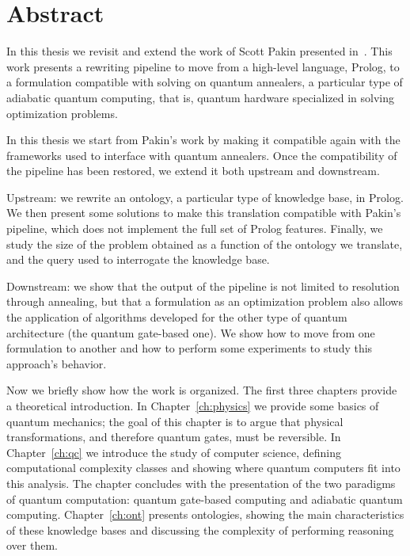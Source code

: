 
\chapter{Abstract}
In this thesis we revisit and extend the work of Scott Pakin presented in~\cite{pakin2018performing}. This work presents a rewriting pipeline to move from a high-level language, Prolog, to a formulation compatible with solving on quantum annealers, a particular type of adiabatic quantum computing, that is, quantum hardware specialized in solving optimization problems.

In this thesis we start from Pakin's work by making it compatible again with the frameworks used to interface with quantum annealers. Once the compatibility of the pipeline has been restored, we extend it both upstream and downstream.

Upstream: we rewrite an ontology, a particular type of knowledge base, in Prolog. We then present some solutions to make this translation compatible with Pakin's pipeline, which does not implement the full set of Prolog features. Finally, we study the size of the problem obtained as a function of the ontology we translate, and the query used to interrogate the knowledge base.

Downstream: we show that the output of the pipeline is not limited to resolution through annealing, but that a formulation as an optimization problem also allows the application of algorithms developed for the other type of quantum architecture (the quantum gate-based one). We show how to move from one formulation to another and how to perform some experiments to study this approach's behavior.

Now we briefly show how the work is organized. The first three chapters provide a theoretical introduction. In Chapter~\ref{ch:physics} we provide some basics of quantum mechanics; the goal of this chapter is to argue that physical transformations, and therefore quantum gates, must be reversible. In Chapter~\ref{ch:qc} we introduce the study of computer science, defining computational complexity classes and showing where quantum computers fit into this analysis. The chapter concludes with the presentation of the two paradigms of quantum computation: quantum gate-based computing and adiabatic quantum computing. Chapter~\ref{ch:ont} presents ontologies, showing the main characteristics of these knowledge bases and discussing the complexity of performing reasoning over them. 

